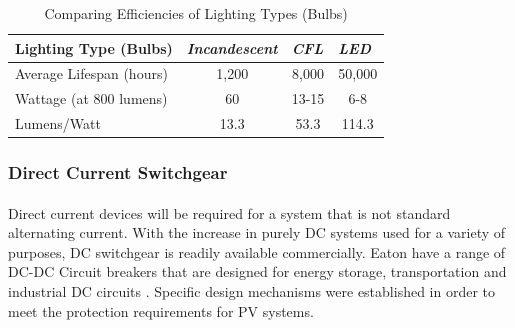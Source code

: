 \begin{table}[!ht]
\centering
\renewcommand{\arraystretch}{2} %
\begin{tabular}{|l|c|c|c|}
\hline
\textbf{Lighting Type (Bulbs)} & \multicolumn{1}{l|}{\textit{Incandescent}} & \multicolumn{1}{l|}{\textit{CFL}} & \multicolumn{1}{l|}{\textit{LED}} \\ \hline
Average Lifespan (hours) & 1,200 & 8,000 & 50,000 \\ \hline
Wattage (at 800 lumens) & 60 & 13-15 & 6-8 \\ \hline
Lumens/Watt & 13.3 & 53.3 & 114.3 \\ \hline
\end{tabular} \quad
\caption{Comparing Efficiencies of Lighting Types (Bulbs) \cite{Koh2011}}
\label{LightingTypes}
\end{table}

\subsubsection{Direct Current Switchgear}

\paragraph{}
Direct current devices will be required for a system that is not standard alternating current. With the increase in purely DC systems used for a variety of purposes, DC switchgear is readily available commercially. Eaton have a range of DC-DC Circuit breakers that are designed for energy storage, transportation and industrial DC circuits \cite{website:Eaton1}. Specific design mechanisms were established in order to meet the protection requirements for PV systems.   

\newpage